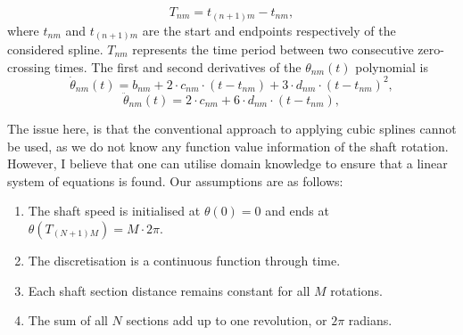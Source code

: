 \documentclass{article}
\begin{document}
	\begin{equation}
		T_{nm} = t_{(n + 1)m} - t_{nm},
	\end{equation}
	where $t_{nm}$ and $t_{(n + 1)m}$ are the start and endpoints respectively of the considered spline. $T_{nm}$ represents the time period between two consecutive zero-crossing times. The first and second derivatives of the $\theta_{nm}(t)$ polynomial is
	\begin{equation}
		\dot{\theta}_{nm}(t) = b_{nm} + 2 \cdot c_{nm} \cdot \left(t - t_{nm} \right) + 3 \cdot d_{nm} \cdot \left( t - t_{nm}\right)^2,
	\end{equation}
	\begin{equation}
		\ddot{\theta}_{nm}(t) = 2 \cdot c_{nm} + 6 \cdot d_{nm} \cdot \left( t - t_{nm}\right),
	\end{equation}
	
	The issue here, is that the conventional approach to applying cubic splines cannot be used, as we do not know any function value information of the shaft rotation. However, I believe that one can utilise domain knowledge to ensure that a linear system of equations is found. Our assumptions are as follows:
	\begin{enumerate}
		\item The shaft speed is initialised at $\theta(0) = 0$ and ends at $\theta(T_{(N + 1)M}) = M \cdot 2 \pi$.
		\item The discretisation is a continuous function through time.
		\item Each shaft section distance remains constant for all $M$ rotations.
		\item The sum of all $N$ sections add up to one revolution, or $2\pi$ radians.
	\end{enumerate}
\end{document}
